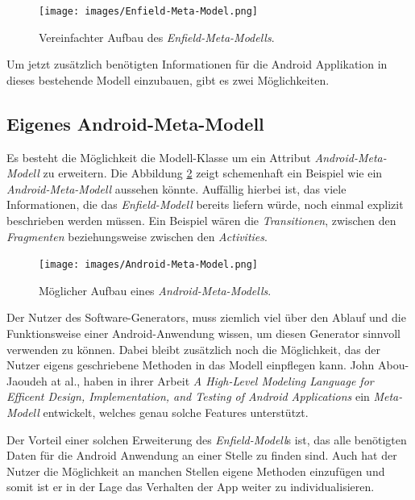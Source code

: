 \begin{figure}[H]
	\begin{center}
		\texttt{[image: images/Enfield-Meta-Model.png]}
		\caption{Vereinfachter Aufbau des \textit{Enfield-Meta-Modells}.}
		\label{fig:enfield-model}
	\end{center}
\end{figure}

Um jetzt zusätzlich benötigten Informationen für die Android Applikation in dieses bestehende Modell einzubauen, gibt es zwei Möglichkeiten.

\subsection{Eigenes Android-Meta-Modell}

Es besteht die Möglichkeit die Modell-Klasse um ein Attribut \textit{Android-Meta-Modell} zu erweitern.
Die Abbildung \ref{fig:android-model} zeigt schemenhaft ein Beispiel wie ein \textit{Android-Meta-Modell} aussehen könnte. Auffällig hierbei ist, das viele Informationen, die das \textit{Enfield-Modell} bereits liefern würde, noch einmal explizit beschrieben werden müssen. Ein Beispiel wären die \textit{Transitionen}, zwischen den \textit{Fragmenten} beziehungsweise zwischen den \textit{Activities}. 


\begin{figure}[H]
	\begin{center}
		\texttt{[image: images/Android-Meta-Model.png]}
		\caption{Möglicher Aufbau eines \textit{Android-Meta-Modells}.}
		\label{fig:android-model}
	\end{center}
\end{figure}

Der Nutzer des Software-Generators, muss ziemlich viel über den Ablauf und die Funktionsweise einer Android-Anwendung wissen, um diesen Generator sinnvoll verwenden zu können.
Dabei bleibt zusätzlich noch die Möglichkeit, das der Nutzer eigens geschriebene Methoden in das Modell einpflegen kann. John Abou-Jaoudeh at al., haben in ihrer Arbeit \textit{A High-Level Modeling Language for Efficent Design, Implementation, and Testing of Android Applications}\cite{abou2015high} ein \textit{Meta-Modell} entwickelt, welches genau solche Features unterstützt.

Der Vorteil einer solchen Erweiterung des \textit{Enfield-Modell}s ist, das alle benötigten Daten für die Android Anwendung an einer Stelle zu finden sind. Auch hat der Nutzer die Möglichkeit an manchen Stellen eigene Methoden einzufügen und somit ist er in der Lage das Verhalten der App weiter zu individualisieren.

